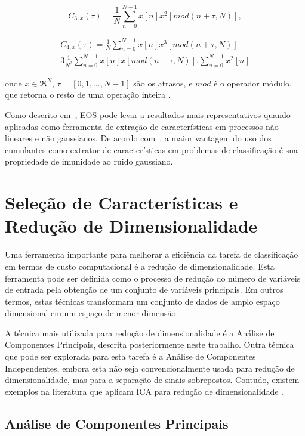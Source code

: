 \begin{equation}
C_{3,x}(\tau) = \frac{1}{N}\sum_{n=0}^{N-1}x[n]x^2[mod(n+\tau,N)],
\label{eq:Dcum3}
\end{equation}

\begin{equation} \label{eq:cum4}
\begin{split}
C_{4,x}(\tau) = \frac{1}{N}\sum_{n=0}^{N-1}x[n]x^3[mod(n+\tau,N)]-\\
3\frac{1}{N^2}\sum_{n=0}^{N-1}x[n]x[mod(n-\tau,N)].\sum_{n=0}^{N-1}x^2[n]
\end{split}
\end{equation}

\noindent onde $x \in \Re^N$, $\tau=[0, 1,...,N-1]$ são os atrasos, e $mod$ é o operador módulo, que retorna o resto de uma operação inteira \cite{moreirahos}.

Como descrito em~, EOS pode levar a resultados mais representativos quando aplicadas como ferramenta de extração de características em processos não lineares e não gaussianos. De acordo com~, a maior vantagem do uso dos cumulantes como extrator de características em problemas de classificação é sua propriedade de imunidade ao ruido gaussiano.


\section{Seleção de Características e Redução de Dimensionalidade}

Uma ferramenta importante para melhorar a eficiência da tarefa de classificação em termos de custo computacional é a redução de dimensionalidade. Esta ferramenta pode ser definida como o processo de redução do número de variáveis de entrada pela obtenção de um conjunto de variáveis principais. Em outros termos, estas técnicas transformam um conjunto de dados de amplo espaço dimensional em um espaço de menor dimensão.

A técnica mais utilizada para redução de dimensionalidade é a Análise de Componentes Principais, descrita posteriormente neste trabalho. Outra técnica que pode ser explorada para esta tarefa é a Análise de Componentes Independentes, embora esta não seja convencionalmente usada para redução de dimensionalidade, mas para a separação de sinais sobrepostos. Contudo, existem exemplos na literatura que aplicam ICA para redução de dimensionalidade \cite{wang2006independent} \cite{cao2003comparison}.

\subsection{Análise de Componentes Principais}

